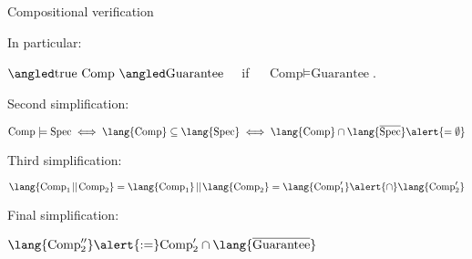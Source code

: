 \documentclass[../talk.tex]{subfiles}
\begin{document}
\begin{frame}{Compositional verification}
\begin{overlayarea}{\slidewidth}{\slideheight}
{{                In particular:

                \vspace*{1em}

                $\relyguarantee{\text{true}}{\text{Comp}}{\text{Guarantee}} \quad$ if
                $\quad \text{Comp} \models \text{Guarantee}$.
            }
        }
        {%
            \vspace*{1em}

            Second simplification:

            \(
                \text{Comp} \models \text{Spec}
                \iff
                \lang{\text{Comp}} \subseteq \lang{\text{Spec}}
                \iff
                \lang{\text{Comp}} \cap \lang{\overline{\text{Spec}}} \alert{= \emptyset}
            \)

            \vspace*{1em}


            {%

                Third simplification:

                \(
                    \lang{ \text{Comp}_1 \!\mid\mid\! \text{Comp}_2 }
                    =
                    \lang{ \text{Comp}_1 } \!\mid\mid\! \lang{ \text{Comp}_2 }
                    =
                    \lang{ \text{Comp}_1' } \alert{\cap} \lang{ \text{Comp}_2' }
                \)

                \vspace*{1em}
            }
            {%

                Final simplification:

                \(
                    \lang{ \text{Comp}_2'' }
                    \alert{:=} \text{Comp}_2' \cap \lang{\overline{\text{Guarantee}}}
                \)
            }
        }
    \end{overlayarea}
\end{frame}
\end{document}
